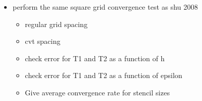 \begin{itemize} 
    \item perform the same square grid convergence test as shu 2008
    \begin{itemize} 
        \item regular grid spacing
        \item cvt spacing
        \item check error for T1 and T2 as a function of h
        \item check error for T1 and T2 as a function of epsilon
        \item Give average convergence rate for stencil sizes
    \end{itemize} 
\end{itemize} 
